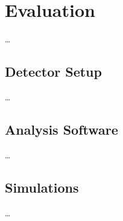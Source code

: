 
\chapter{Evaluation}
\label{ch:Evaluation}

\dots


\section{Detector Setup}
\label{ch:Evaluation:sec:DetectorSetup}

\dots


\section{Analysis Software}
\label{ch:Evaluation:sec:AnalysisSoftware}

\dots


\section{Simulations}
\label{ch:Evaluation:sec:Simulations}

\dots

